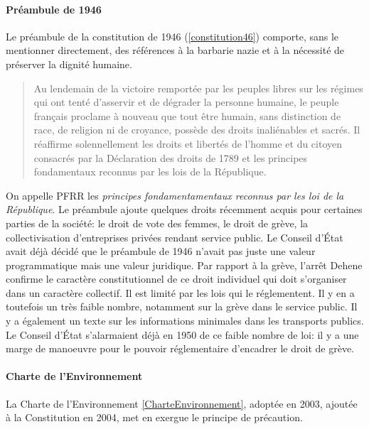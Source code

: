\documentclass[math]{cours}
\begin{document}
\paragraph{Préambule de 1946}
Le préambule de la constitution de 1946 (\ref{constitution46}) comporte, sans le mentionner directement, des références à la barbarie nazie et à la nécessité de préserver la dignité humaine.
\begin{quote}
	 Au lendemain de la victoire remportée par les peuples libres sur les régimes qui ont tenté d'asservir et de dégrader la personne humaine, le peuple français proclame à nouveau que tout être humain, sans distinction de race, de religion ni de croyance, possède des droits inaliénables et sacrés. Il réaffirme solennellement les droits et libertés de l'homme et du citoyen consacrés par la Déclaration des droits de 1789 et les principes fondamentaux reconnus par les lois de la République.
\end{quote}
On appelle PFRR les \emph{principes fondamentamentaux reconnus par les loi de la République}.
Le préambule ajoute quelques droits récemment acquis pour certaines parties de la société: le droit de vote des femmes, le droit de grève, la collectivisation d'entreprises privées rendant service public.
Le Conseil d'État avait déjà décidé que le préambule de 1946 n'avait pas juste une valeur programmatique mais une valeur juridique.
Par rapport à la grève, l'arrêt Dehene confirme le caractère constitutionnel de ce droit individuel qui doit s'organiser dans un caractère collectif.
Il est limité par les lois qui le réglementent. Il y en a toutefois un très faible nombre, notamment sur la grève dans le service public.
Il y a également un texte sur les informations minimales dans les transports publics.
Le Conseil d'État s'alarmaient déjà en 1950 de ce faible nombre de loi: il y a une marge de manoeuvre pour le pouvoir réglementaire d'encadrer le droit de grève.

\paragraph{Charte de l'Environnement}
La Charte de l'Environnement \ref{CharteEnvironnement}, adoptée en 2003, ajoutée à la Constitution en 2004, met en exergue le principe de précaution.
\end{document}
